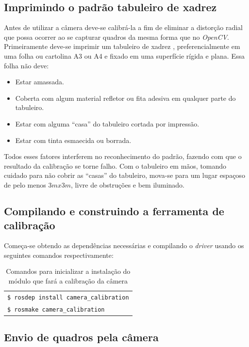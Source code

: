 \subsection{Imprimindo o padrão tabuleiro de xadrez}

Antes de utilizar a câmera deve-se calibrá-la a fim de eliminar a distorção radial que possa ocorrer ao se capturar quadros da mesma forma que no \textit{OpenCV}.
Primeiramente deve-se imprimir um tabuleiro de xadrez \cite{Setup-CalibrateMonocularCamera}, preferencialmente em uma folha ou cartolina A3 ou A4 e fixado em uma superfície rígida e plana. Essa folha não deve: 

\begin{itemize}
	\item{Estar amassada.}
	\item{Coberta com algum material refletor ou fita adesiva em qualquer parte do tabuleiro.}
	\item{Estar com alguma “casa” do tabuleiro cortada por impressão.}
	\item{Estar com tinta esmaecida ou borrada.}
\end{itemize}	

Todos esses fatores interferem no reconhecimento do padrão, fazendo com que o resultado da calibração se torne falho. Com o tabuleiro em mãos, tomando cuidado para não cobrir as “casas” do tabuleiro, mova-se para um lugar espaçoso de pelo menos $3mx3m$, livre de obstruções e bem iluminado.

\subsection{Compilando e construindo a ferramenta de calibração}

Começa-se obtendo as dependências necessárias e compilando o \textit{driver} usando os seguintes comandos respectivamente:

\begin{table}[H]\label{tb:1}
\begin{tabular}{| p{\textwidth}|}
\hline
\texttt{\$ rosdep install camera\_calibration} \\
\texttt{\$ rosmake camera\_calibration} \\ \hline
\end{tabular}
\caption{Comandos para inicializar a instalação do módulo que fará a calibração da câmera}
\end{table}


\subsection{Envio de quadros pela câmera}

